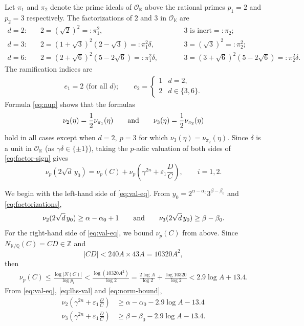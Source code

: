 \documentclass[11pt,a4paper]{article}
\numberwithin{equation}{section}
\numberwithin{table}{section}
\numberwithin{figure}{section}
\begin{document}
Let $\pi_1$ and $\pi_2$ denote the prime ideals of $\mathcal{O}_{\mathbb{K}}$ above the rational primes $p_1 = 2$ and $p_2 = 3$ respectively. The factorizations of $2$ and $3$ in $\mathcal{O}_{\mathbb{K}}$ are
\begin{equation}\label{eq:factorizations}
	\begin{alignedat}{3}
		d=2{:}\quad
		& 2 = (\sqrt{2})^2 =: \pi_1^2, &\qquad& 3 \text{ is inert} =: \pi_2;\\
		d=3{:}\quad
		& 2 = (1+\sqrt{3})^2(2-\sqrt{3}) =: \pi_1^2\delta, &\qquad&
		3 = (\sqrt{3})^2 =: \pi_2^2;\\
		d=6{:}\quad
		& 2 = (2+\sqrt{6})^2(5-2\sqrt{6}) =: \pi_1^2\delta, &\qquad&
		3 = (3+\sqrt{6})^2(5-2\sqrt{6}) =: \pi_2^2\delta.
	\end{alignedat}
\end{equation}
The ramification indices are
\begin{align*}
	e_1 = 2 \text{ (for all } d\text{)};\qquad
	e_2 = \begin{cases}1 & d=2,\\2 & d\in\{3,6\}.\end{cases}
\end{align*}
Formula \eqref{eq:nup} shows that the formulas
$$
\nu_2(\eta)=\frac{1}{2} \nu_{\pi_1}(\eta)\qquad {\text{\rm and}}\qquad \nu_3(\eta)=\frac{1}{2} \nu_{\pi_2}(\eta)
$$
hold in all cases except when $d=2,~p=3$ for which $\nu_3(\eta)=\nu_{\pi_2}(\eta)$. Since $\delta$ is a unit in $\mathcal{O}_{\mathbb{K}}$ (as
$\gamma\delta \in \{\pm 1\}$), taking the $p$-adic valuation of both sides of \eqref{eq:factor-sign} gives
\begin{equation}\label{eq:val-eq}
	\nu_{p}(2\sqrt{d}\,y_0)
	= \nu_{p}(C) + \nu_{p}\!\left(\gamma^{2n}+\varepsilon_1\frac{D}{C}\right),
	\qquad i = 1, 2.
\end{equation}

We begin with the left-hand side of \eqref{eq:val-eq}. From $y_0 = 2^{\alpha-\alpha_0}3^{\beta-\beta_0}$ and \eqref{eq:factorizations},
\begin{equation}\label{eq:lhs-val}
	\nu_{2} (2\sqrt{d}\,y_0) \geq \alpha-\alpha_0+1 \qquad {\text{\rm and}}\qquad \nu_{3}(2\sqrt{d}\,y_0) \geq \beta-\beta_0.
\end{equation}
For the right-hand side of \eqref{eq:val-eq}, we bound $\nu_{p}(C)$ from above. Since $N_{\mathbb{K}/\mathbb{Q}}(C) = CD \in \mathbb{Z}$ and
$$|CD| < 240A \times 43A = 10320A^2,$$
then
\begin{align}\label{eq:norm-bound}
	\nu_{p}(C)
	\leq \frac{\log|N(C)|}{\log p_i}
	< \frac{\log(10320A^2)}{\log 2}
	= \frac{2\log A}{\log 2} + \frac{\log 10320}{\log 2}
	< 2.9\log A + 13.4.
\end{align}
From \eqref{eq:val-eq}, \eqref{eq:lhs-val} and \eqref{eq:norm-bound},
\begin{align}
	\nu_{2}\!\left(\gamma^{2n}+\varepsilon_1\frac{D}{C}\right)
	&\geq \alpha-\alpha_0 - 2.9\log A - 13.4\label{eq:lower1}\\
	\nu_{3}\!\left(\gamma^{2n}+\varepsilon_1\frac{D}{C}\right)
	&\geq \beta-\beta_0 - 2.9\log A - 13.4. \label{eq:lower2}
\end{align}
\end{document}
